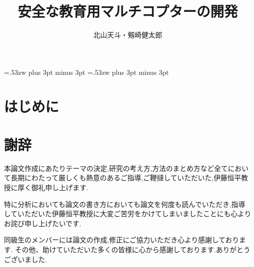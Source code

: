 \documentclass[12pt,oneside]{sotsuken_paper}
\title{安全な教育用マルチコプターの開発}
\author{北山天斗・剱崎健太郎}
\begin{document}
\setlength{\baselineskip}{9truemm}

\kanjiskip=.53zw plus 3pt minus 3pt
\xkanjiskip=.53zw plus 3pt minus 3pt

\tableofcontents


\chapter{はじめに}


\chapter*{謝辞}
本論文作成にあたりテーマの決定,研究の考え方,方法のまとめ方など全てにおいて長期にわたって厳しくも熱意のあるご指導,ご鞭撻していただいた,伊藤恒平教授に厚く御礼申し上げます.


特に分析においても論文の書き方においても論文を何度も読んでいただき,指導していただいた伊藤恒平教授に大変ご苦労をかけてしまいましたことにも心よりお詫び申し上げたいです.


同級生のメンバーには論文の作成,修正にご協力いただき心より感謝しております.
その他、助けていただいた多くの皆様に心から感謝しております.ありがとうございました.
\end{document}
